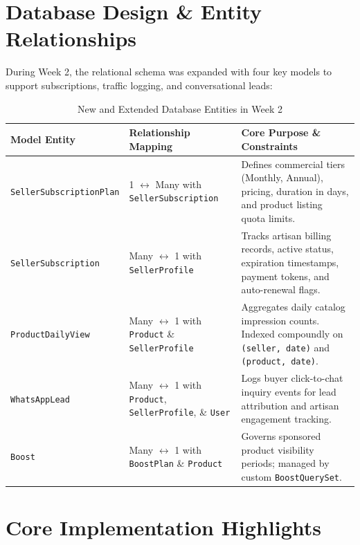 \documentclass[12pt,a4paper]{article}
\begin{document}
\section{Database Design \& Entity Relationships}

During Week 2, the relational schema was expanded with four key models to support subscriptions, traffic logging, and conversational leads:

\begin{table}[h]
\centering
\small
\begin{tabularx}{\textwidth}{l p{4.2cm} X}
\toprule
\textbf{Model Entity} & \textbf{Relationship Mapping} & \textbf{Core Purpose \& Constraints} \\
\midrule
\texttt{SellerSubscriptionPlan} & 1 $\leftrightarrow$ Many with \texttt{SellerSubscription} & Defines commercial tiers (Monthly, Annual), pricing, duration in days, and product listing quota limits. \\
\texttt{SellerSubscription} & Many $\leftrightarrow$ 1 with \texttt{SellerProfile} & Tracks artisan billing records, active status, expiration timestamps, payment tokens, and auto-renewal flags. \\
\texttt{ProductDailyView} & Many $\leftrightarrow$ 1 with \texttt{Product} \& \texttt{SellerProfile} & Aggregates daily catalog impression counts. Indexed compoundly on \texttt{(seller, date)} and \texttt{(product, date)}. \\
\texttt{WhatsAppLead} & Many $\leftrightarrow$ 1 with \texttt{Product}, \texttt{SellerProfile}, \& \texttt{User} & Logs buyer click-to-chat inquiry events for lead attribution and artisan engagement tracking. \\
\texttt{Boost} & Many $\leftrightarrow$ 1 with \texttt{BoostPlan} \& \texttt{Product} & Governs sponsored product visibility periods; managed by custom \texttt{BoostQuerySet}. \\
\bottomrule
\end{tabularx}
\caption{New and Extended Database Entities in Week 2}
\label{tab:new_entities}
\end{table}

\section{Core Implementation Highlights}
\end{document}
